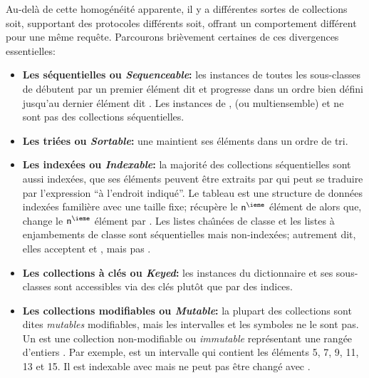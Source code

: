 \documentclass[a4paper,10pt,twoside]{book}
\begin{document}
Au-del\`a de cette homog\'en\'eit\'e apparente,
il y a diff\'erentes sortes de collections soit, supportant des protocoles 
diff\'erents soit, offrant un comportement diff\'erent pour une m\^eme requ\^ete.
Parcourons bri\`evement certaines de ces divergences essentielles:

\begin{itemize}
  \item {\bf Les s\'equentielles ou \emph{Sequenceable}:}
  les instances de toutes les sous-classes de  
d\'ebutent par un premier \'el\'ement dit  et progresse dans un ordre bien d\'efini jusqu'au
dernier \'el\'ement dit .
Les instances de ,  (ou multiensemble) et  ne sont pas des collections s\'equentielles.

  \item {\bf Les tri\'ees ou \emph{Sortable}:}
une  maintient ses \'el\'ements dans un ordre de 
tri.

  \item {\bf Les index\'ees ou \emph{Indexable}:}
la majorit\'e des collections s\'equentielles sont aussi index\'ees, \cad
que ses \'el\'ements peuvent \^etre extraits par 	
 qui peut se traduire par l'expression ``\`a l'endroit indiqu\'e''.
	Le tableau  est une structure de donn\'ees index\'ees famili\`ere avec une taille fixe;   r\'ecup\`ere le
 $\mbox{\ct{n}}^{\ieme}$ \'el\'ement de  alors que, 
 change le $\mbox{\ct{n}}^{\ieme}$ \'el\'ement 
par .
	Les listes cha\^{\i}n\'ees de classe  et
les listes \`a enjambements de classe  sont s\'equentielles mais non-index\'ees; autrement dit, elles acceptent  et , mais pas .

  \item {\bf Les collections \`a cl\'es ou \emph{Keyed}:}
	les instances du dictionnaire  et ses sous-classes
sont accessibles via des cl\'es plut\^ot que par des indices.

  \item {\bf Les collections modifiables ou \emph{Mutable}:}
  	la plupart des collections sont dites \emph{mutables} \cad modifiables, mais les intervalles  et les symboles  ne le sont pas.
	Un  est une collection non-modifiable ou \emph{immutable} repr\'esentant une rang\'ee d'entiers .  Par exemple, 
 est un intervalle  qui contient les 
\'el\'ements 5, 7, 9, 11, 13 et 15.  Il est indexable avec  mais ne peut pas \^etre chang\'e avec .


\end{itemize}
\end{document}
